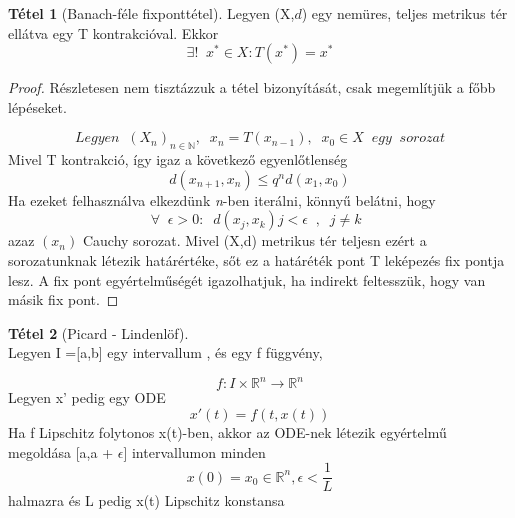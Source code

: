 \documentclass{article}
\theoremstyle{definition}
\theoremstyle{theorem}
\newtheorem{theorem}{Tétel}
\begin{document}
\begin{theorem}[Banach-féle fixponttétel]
Legyen (X,$\textit{d}$) egy nemüres, teljes metrikus tér ellátva egy T kontrakcióval. Ekkor 
\begin{equation*}
    \exists!\;\; x^* \in X : T(x^*) = x^*
\end{equation*}
\end{theorem}
\begin{proof}
Részletesen nem tisztázzuk a tétel bizonyítását, csak megemlítjük a főbb lépéseket.
 
\begin{equation*}
Legyen\;\;(X_n)_{n \in \mathbb{N}},\;\; x_n = T(x_{n-1}), \;\;x_0 \in X \;\;egy \;\; sorozat
\end{equation*}
Mivel T kontrakció, így igaz a következő egyenlőtlenség 
\begin{equation*}
    d(x_{n+1},x_n) \leq q^n d(x_1,x_0)
\end{equation*}
Ha ezeket felhasználva elkezdünk \textit{n}-ben iterálni, könnyű belátni, hogy
\begin{equation*}
    \forall \;\; \epsilon >0 : \;\;d(x_j,x_k) j < \epsilon\;\;, \;\;j\neq k  \;\; 
\end{equation*}
azaz  $(x_n)$ Cauchy  sorozat.
Mivel (X,d) metrikus tér teljesn ezért a sorozatunknak létezik határértéke, sőt ez a határéték pont T leképezés fix pontja lesz. A fix pont egyértelműségét igazolhatjuk, ha indirekt feltesszük, hogy van másik fix pont.
\end{proof}
\begin{theorem} [Picard - Lindenlöf] \\
Legyen I =[a,b] egy intervallum , és egy f függvény,

\begin{equation*}
f :  I \times \mathbb{R}^n \rightarrow \mathbb{R}^n 
\end{equation*}
Legyen x' pedig egy ODE
\[
x'(t) = f(t,x(t))
\]
Ha f Lipschitz folytonos x(t)-ben, akkor az ODE-nek létezik egyértelmű megoldása [a,a + $\epsilon$] 
intervallumon minden 
\[
x(0) = x_0 \in \mathbb{R}^n, \epsilon < \frac{1}{L}
\] halmazra és L pedig x(t) Lipschitz konstansa
\end{theorem}
\end{document}
